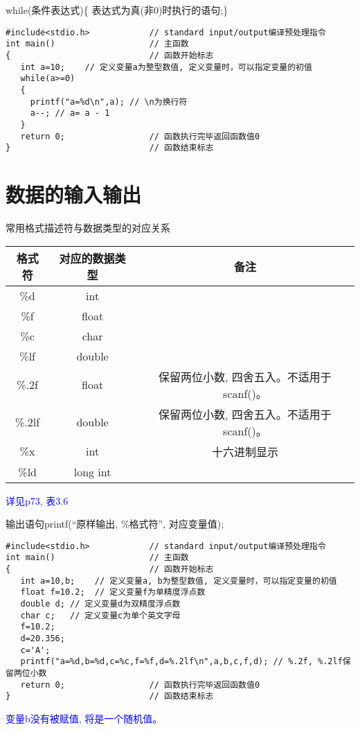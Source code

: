 \begin{frame}[fragile]{while(条件表达式)\{ 表达式为真(非0)时执行的语句;\}}
\begin{lstlisting}
#include<stdio.h>            // standard input/output编译预处理指令
int main()                   // 主函数
{                            // 函数开始标志
   int a=10;    // 定义变量a为整型数值, 定义变量时，可以指定变量的初值
   while(a>=0)
   {
     printf("a=%d\n",a); // \n为换行符
     a--; // a= a - 1
   }
   return 0;                 // 函数执行完毕返回函数值0
}                            // 函数结束标志
\end{lstlisting}
\end{frame}

\section{数据的输入输出}

\begin{frame}{常用格式描述符与数据类型的对应关系}
\begin{tabular}{|c|c|c|}
	\hline 
	\textbf{格式符} & \textbf{对应的数据类型} &  \textbf{备注}\\ 
	\hline 
	\%d & int &  \\ 
	\hline  
	\%f & float &  \\
	\hline
	\%c & char & \\ 
	\hline   
	\%lf & double & \\ 
	\hline 
	\%.2f & float & 保留两位小数, 四舍五入。不适用于scanf()。 \\ 
	\hline 
	\%.2lf & double & 保留两位小数, 四舍五入。不适用于scanf()。 \\ 
	\hline
	\hline   
	\%x & int & 十六进制显示 \\ 
	\hline 
	\%ld & long int &  \\ 
	\hline 
\end{tabular}
\newline
\newline
\textcolor{blue}{详见p73, 表3.6}
\end{frame}

\begin{frame}{输出语句printf(``原样输出, \%格式符'', 对应变量值);}
\begin{lstlisting}
#include<stdio.h>            // standard input/output编译预处理指令
int main()                   // 主函数
{                            // 函数开始标志
   int a=10,b;    // 定义变量a, b为整型数值, 定义变量时，可以指定变量的初值
   float f=10.2;  // 定义变量f为单精度浮点数
   double d; // 定义变量d为双精度浮点数
   char c;   // 定义变量c为单个英文字母
   f=10.2;
   d=20.356;
   c='A';
   printf("a=%d,b=%d,c=%c,f=%f,d=%.2lf\n",a,b,c,f,d); // %.2f, %.2lf保留两位小数
   return 0;                 // 函数执行完毕返回函数值0
}                            // 函数结束标志
\end{lstlisting}
\textcolor{blue}{变量b没有被赋值, 将是一个随机值。}
\end{frame}

